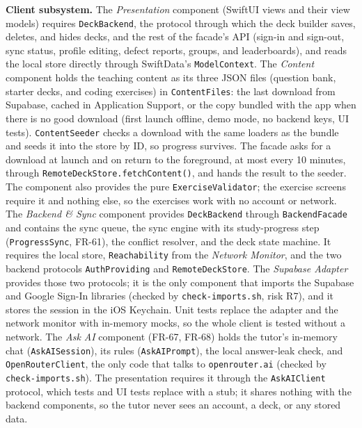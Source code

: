 \documentclass[12pt,letterpaper]{article}
\begin{document}
\textbf{Client subsystem.} The \emph{Presentation} component (SwiftUI views and their
view models) requires \texttt{DeckBackend}, the protocol through which the deck builder
saves, deletes, and hides decks, and the rest of the facade's API (sign-in and
sign-out, sync status, profile editing, defect reports, groups, and leaderboards),
and reads the local store directly through SwiftData's \texttt{ModelContext}. The
\emph{Content} component holds the teaching content as its three JSON files (question
bank, starter decks, and coding exercises) in \texttt{ContentFiles}: the last
download from Supabase, cached in Application Support, or the copy bundled with the
app when there is no good download (first launch offline, demo mode, no backend keys,
UI tests). \texttt{ContentSeeder} checks a download with the same loaders as the
bundle and seeds it into the store by ID, so progress survives. The facade asks for a
download at launch and on return to the foreground, at most every 10 minutes, through
\texttt{RemoteDeckStore.fetchContent()}, and hands the result to the seeder. The
component also provides the pure \texttt{ExerciseValidator}; the exercise screens
require it and nothing else, so the exercises work with no account or network. The \emph{Backend \& Sync} component provides
\texttt{DeckBackend} through \texttt{BackendFacade} and contains the sync queue, the
sync engine with its study-progress step (\texttt{ProgressSync}, FR-61), the conflict
resolver, and the deck state machine. It requires the local
store, \texttt{Reachability} from the \emph{Network Monitor}, and the two backend
protocols \texttt{AuthProviding} and \texttt{RemoteDeckStore}. The \emph{Supabase
Adapter} provides those two protocols; it is the only component that imports the
Supabase and Google Sign-In libraries (checked by \texttt{check-imports.sh}, risk R7),
and it stores the session in the iOS Keychain. Unit tests replace the adapter and the
network monitor with in-memory mocks, so the whole client is tested without a network.
The \emph{Ask AI} component (FR-67, FR-68) holds the tutor's in-memory chat
(\texttt{AskAISession}), its rules (\texttt{AskAIPrompt}), the local answer-leak check,
and \texttt{OpenRouterClient}, the only code that talks to \texttt{openrouter.ai}
(checked by \texttt{check-imports.sh}). The presentation requires it through the
\texttt{AskAIClient} protocol, which tests and UI tests replace with a stub; it shares
nothing with the backend components, so the tutor never sees an account, a deck, or
any stored data.
\end{document}
